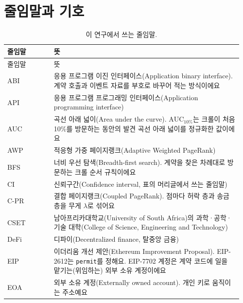 \chapter*{줄임말과 기호}
\label{ch:abbreviations}
\let\FrontMatterSavedThetable\thetable
\renewcommand{\thetable}{\Roman{table}}

\begingroup
\small{}\setlength{\tabcolsep}{4pt}\renewcommand{\arraystretch}{1.0}%
\setlength{\LTpre}{2pt}\setlength{\LTpost}{6pt}%
\begin{longtable}{@{}>{\raggedright\arraybackslash}p{0.19\linewidth}p{0.77\linewidth}@{}}
\caption{이 연구에서 쓰는 줄임말.}\label{tab:abbreviations}\\
\toprule
줄임말 & 뜻 \\
\midrule
\endfirsthead
\toprule
줄임말 & 뜻 \\
\midrule
\endhead
\bottomrule
\endfoot
ABI & 응용 프로그램 이진 인터페이스(Application binary interface). 계약 호출과 이벤트 자료를 부호로 바꾸어 적는 방식이에요 \\
API & 응용 프로그램 프로그래밍 인터페이스(Application programming interface) \\
AUC & 곡선 아래 넓이(Area under the curve). $\mathrm{AUC}_{10\%}$는 크롤이 처음 10\%를 방문하는 동안의 발견 곡선 아래 넓이를 정규화한 값이에요 \\
AWP & 적응형 가중 페이지랭크(Adaptive Weighted PageRank) \\
BFS & 너비 우선 탐색(Breadth-first search). 계약을 찾은 차례대로 방문하는 크롤 순서 규칙이에요 \\
CI & 신뢰구간(Confidence interval, 표의 머리글에서 쓰는 줄임말) \\
\mbox{C-PR} & 결합 페이지랭크(Coupled PageRank). 점마다 허락 층과 송금 층을 무게 $\lambda$로 섞어요 \\
CSET & 남아프리카대학교(University of South Africa)의 과학·공학·기술 대학(College of Science, Engineering and Technology) \\
DeFi & 디파이(Decentralized finance, 탈중앙 금융) \\
EIP & 이더리움 개선 제안(Ethereum Improvement Proposal). EIP-2612는 \texttt{permit}를 정해요. EIP-7702 계정은 계약 코드에 일을 맡기는(위임하는) 외부 소유 계정이에요 \\
EOA & 외부 소유 계정(Externally owned account). 개인 키로 움직이는 주소예요 \\

\end{longtable}
